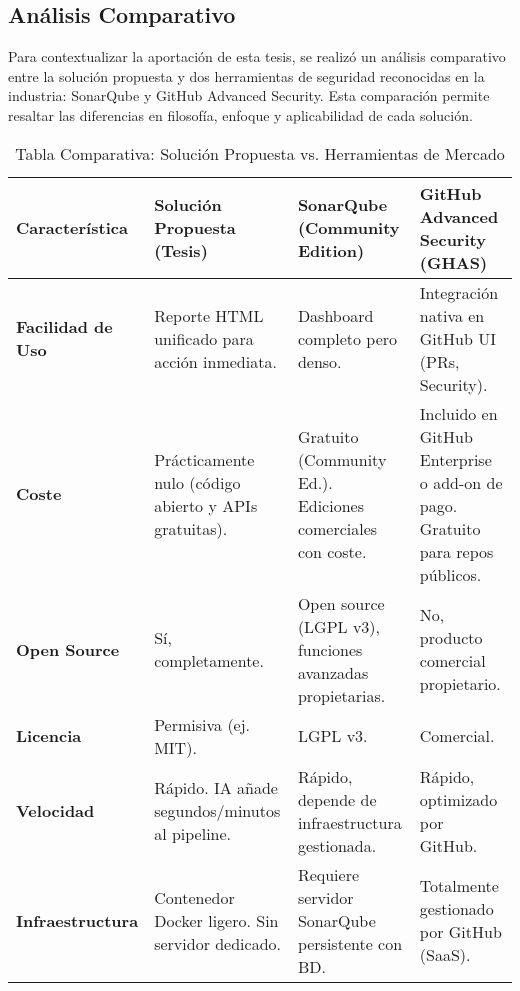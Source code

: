 \subsection{Análisis Comparativo}

Para contextualizar la aportación de esta tesis, se realizó un análisis comparativo entre la solución propuesta y dos herramientas de seguridad reconocidas en la industria: SonarQube y GitHub Advanced Security. Esta comparación permite resaltar las diferencias en filosofía, enfoque y aplicabilidad de cada solución.

\begin{table}[h!]
\centering
\caption{Tabla Comparativa: Solución Propuesta vs. Herramientas de Mercado}
\label{tab:comparativa_sistemas}
\begin{tabular}{|p{2.6cm}|p{3.9cm}|p{3.9cm}|p{3.9cm}|}
\hline
\textbf{Característica} & 
\textbf{Solución Propuesta (Tesis)} & 
\textbf{SonarQube (Community Edition)} \cite{sonarqube_editions} & 
\textbf{GitHub Advanced Security (GHAS)} \cite{ghas_docs} \\ \hline

\textbf{Facilidad de Uso} & 
Reporte HTML unificado para acción inmediata. & 
Dashboard completo pero denso. & 
Integración nativa en GitHub UI (PRs, Security). \\ \hline

\textbf{Coste} & 
Prácticamente nulo (código abierto y APIs gratuitas). & 
Gratuito (Community Ed.). Ediciones comerciales con coste. & 
Incluido en GitHub Enterprise o add-on de pago. Gratuito para repos públicos. \\ \hline

\textbf{Open Source} & 
Sí, completamente. & 
Open source (LGPL v3), funciones avanzadas propietarias. & 
No, producto comercial propietario. \\ \hline

\textbf{Licencia} & 
Permisiva (ej. MIT). & 
LGPL v3. & 
Comercial. \\ \hline

\textbf{Velocidad} & 
Rápido. IA añade segundos/minutos al pipeline. & 
Rápido, depende de infraestructura gestionada. & 
Rápido, optimizado por GitHub. \\ \hline

\textbf{Infraestructura} & 
Contenedor Docker ligero. Sin servidor dedicado. & 
Requiere servidor SonarQube persistente con BD. & 
Totalmente gestionado por GitHub (SaaS). \\ \hline


\end{tabular}
\end{table}
